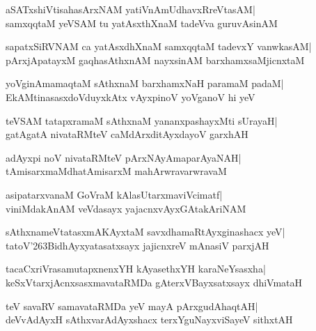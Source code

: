\documentclass[twoside,12pt,openright]{book}
\def\S{\char'263}
\newcounter{shloka}[chapter]
\begin{document}
\begin{shloka}%
aSATxshiVtisahasArxNAM yatiVnAmUdhavxRreVtasAM|\\
samxqqtaM yeVSAM tu yatAsxthXnaM tadeVva guruvAsinAM
\end{shloka}

\begin{shloka}%
sapatxSiRVNAM ca yatAsxdhXnaM samxqqtaM tadevxY vanwkasAM|\\
pArxjApatayxM gaqhasAthxnAM nayxsinAM barxhamxsaMjicnxtaM
\end{shloka}

\begin{shloka}%
yoVginAmamaqtaM sAthxnaM barxhamxNaH paramaM padaM|\\
EkAMtinasasxdoVduyxkAtx vAyxpinoV yoVganoV hi yeV
\end{shloka}

\begin{shloka}%
teVSAM tatapxramaM sAthxnaM yananxpashayxMti sUrayaH|\\
gatAgatA nivataRMteV caMdArxditAyxdayoV garxhAH
\end{shloka}

\begin{shloka}%
adAyxpi noV nivataRMteV pArxNAyAmaparAyaNAH|\\
tAmisarxmaMdhatAmisarxM mahArwravarwravaM
\end{shloka}

\begin{shloka}%
asipatarxvanaM GoVraM kAlasUtarxmaviVcimatf|\\
viniMdakAnAM veVdasayx yajacnxvAyxGAtakAriNAM
\end{shloka}

\begin{shloka}%
sAthxnameVtatasxmAKAyxtaM savxdhamaRtAyxginashacx yeV|\\
tatoV\S BidhAyxyatasatxsayx jajicnxreV mAnasiV parxjAH
\end{shloka}

\begin{shloka}%
tacaCxriVrasamutapxnenxYH kAyasethxYH karaNeYsasxha|\\
keSxVtarxjAcnxsasxmavataRMDa gAterxVBayxsatxsayx dhiVmataH
\end{shloka}

\begin{shloka}%
teV savaRV samavataRMDa yeV mayA pArxgudAhaqtAH|\\
deVvAdAyxH sAthxvarAdAyxshacx terxYguNayxviSayeV sithxtAH
\end{shloka}
\end{document}
